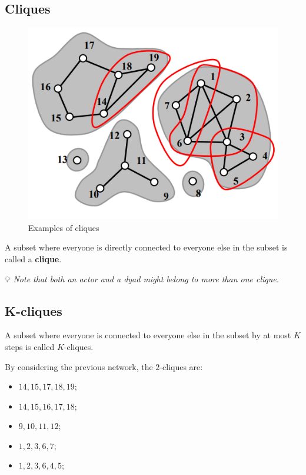 \documentclass[
  notitlepage,
  onecolumn,
  openany]{book}
\providecommand{\tightlist}{%
  \setlength{\itemsep}{0pt}\setlength{\parskip}{0pt}}
\begin{document}
\hypertarget{cliques}{%
\subsection{Cliques}\label{cliques}}

\begin{figure}[h!]

{\centering \includegraphics[width=0.5\linewidth]{images/11-Subgroups and Structural Equivalence/Untitled 1} 

}

\caption{Examples of cliques}\label{fig:unnamed-chunk-79}
\end{figure}

A subset where everyone is directly connected to everyone else in the subset is called a \textbf{clique}.

💡 \emph{Note that both an actor and a dyad might belong to more than one clique.}

\hypertarget{k-cliques}{%
\subsection{K-cliques}\label{k-cliques}}

A subset where everyone is connected to everyone else in the subset by at most \(K\) steps is called \(K\)-cliques.

By considering the previous network, the \(2\)-cliques are:

\begin{itemize}
\tightlist
\item
  \(14, 15, 17, 18, 19\);
\item
  \(14, 15, 16, 17, 18\);
\item
  \(9, 10, 11, 12\);
\item
  \(1, 2, 3, 6, 7\);
\item
  \(1, 2, 3, 6, 4, 5\);
\end{itemize}
\end{document}

